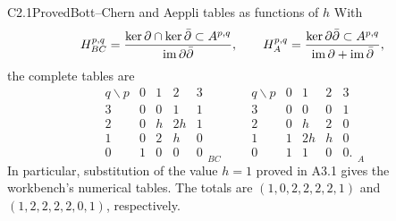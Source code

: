 \begin{claim}{C2.1}{Proved}{Bott--Chern and Aeppli tables as functions of $h$}
With
\[
H^{p,q}_{BC}=
\frac{\ker\partial\cap\ker\bar\partial\subset A^{p,q}}
{\operatorname{im}\partial\bar\partial},\qquad
H^{p,q}_{A}=
\frac{\ker\partial\bar\partial\subset A^{p,q}}
{\operatorname{im}\partial+\operatorname{im}\bar\partial},
\]
the complete tables are
\begin{equation}\label{eq:C-BC-A}
\begin{array}{c|rrrr}
q\backslash p&0&1&2&3\\\hline
3&0&0&1&1\\
2&0&h&2h&1\\
1&0&2&h&0\\
0&1&0&0&0
\end{array}_{BC}
\qquad
\begin{array}{c|rrrr}
q\backslash p&0&1&2&3\\\hline
3&0&0&0&1\\
2&0&h&2&0\\
1&1&2h&h&0\\
0&1&1&0&0.
\end{array}_{A}
\end{equation}
In particular, substitution of the value $h=1$ proved in A3.1 gives
the workbench's numerical tables.  The totals are
$(1,0,2,2,2,2,1)$ and $(1,2,2,2,2,0,1)$, respectively.
\end{claim}
